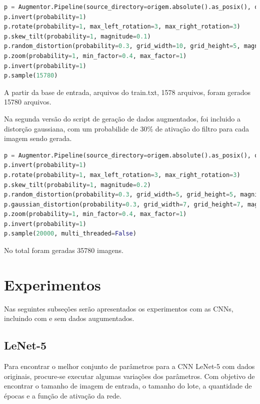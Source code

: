 \documentclass[12pt,
	english,			%
	french,				%
	spanish,			%
	brazil,				%
	]{article}
\begin{document}
\begin{lstlisting}[caption={CNN escolhida},captionpos=b,frame=single,label={code:augmented1}, language=Python]
p = Augmentor.Pipeline(source_directory=origem.absolute().as_posix(), output_directory=destino.absolute().as_posix())
p.invert(probability=1)
p.rotate(probability=1, max_left_rotation=3, max_right_rotation=3)
p.skew_tilt(probability=1, magnitude=0.1)
p.random_distortion(probability=0.3, grid_width=10, grid_height=5, magnitude=8)
p.zoom(probability=1, min_factor=0.4, max_factor=1)
p.invert(probability=1)
p.sample(15780)
\end{lstlisting}

A partir da base de entrada, arquivos do train.txt, 1578 arquivos, foram gerados 15780 arquivos.

Na segunda versão do script de geração de dados augmentados, foi incluido a distorção gaussiana, com um probabilide de 30\% de ativação do filtro para cada imagem sendo gerada.

\begin{lstlisting}[caption={CNN escolhida},captionpos=b,frame=single,label={code:augmented2}, language=Python]
p = Augmentor.Pipeline(source_directory=origem.absolute().as_posix(), output_directory=destino.absolute().as_posix())
p.invert(probability=1)
p.rotate(probability=1, max_left_rotation=3, max_right_rotation=3)
p.skew_tilt(probability=1, magnitude=0.2)
p.random_distortion(probability=0.3, grid_width=5, grid_height=5, magnitude=8)
p.gaussian_distortion(probability=0.3, grid_width=7, grid_height=7, magnitude=10, corner='dl', method='out')
p.zoom(probability=1, min_factor=0.4, max_factor=1)
p.invert(probability=1)
p.sample(20000, multi_threaded=False)
\end{lstlisting}

No total foram geradas 35780 imagens.

\section{Experimentos}

Nas seguintes subseções serão apresentados os experimentos com as CNNs, incluindo com e sem dados augumentados.

\subsection{LeNet-5}

Para encontrar o melhor conjunto de parâmetros para a CNN LeNet-5 com dados originais, procure-se executar algumas variações dos parâmetros. Com objetivo de encontrar o tamanho de imagem de entrada, o tamanho do lote, a quantidade de épocas e a função de ativação da rede.
\end{document}
